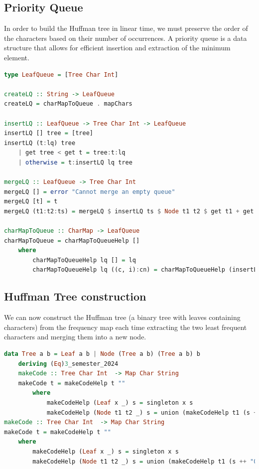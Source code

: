\documentclass{article}
\begin{document}
\subsection{Priority Queue}

In order to build the Huffman tree in linear time, we must preserve the order of
the characters based on their number of occurrences. A priority queue is a data structure that allows for efficient insertion and extraction of the minimum element.

\begin{lstlisting}[language=Haskell, caption={Priority queue implementation using a binary tree.}]
type LeafQueue = [Tree Char Int]

createLQ :: String -> LeafQueue
createLQ = charMapToQueue . mapChars

insertLQ :: LeafQueue -> Tree Char Int -> LeafQueue
insertLQ [] tree = [tree]
insertLQ (t:lq) tree
    | get tree < get t = tree:t:lq
    | otherwise = t:insertLQ lq tree

mergeLQ :: LeafQueue -> Tree Char Int
mergeLQ [] = error "Cannot merge an empty queue"
mergeLQ [t] = t
mergeLQ (t1:t2:ts) = mergeLQ $ insertLQ ts $ Node t1 t2 $ get t1 + get t2

charMapToQueue :: CharMap -> LeafQueue
charMapToQueue = charMapToQueueHelp []
    where
        charMapToQueueHelp lq [] = lq
        charMapToQueueHelp lq ((c, i):cn) = charMapToQueueHelp (insertLQ lq $ Leaf c i) cn
\end{lstlisting}

\subsection{Huffman Tree construction}

We can now construct the Huffman tree (a binary tree with leaves containing characters) from the frequency map
each time extracting the two least frequent characters and merging them into a new node.

\begin{lstlisting}[language=Haskell, caption={Huffman tree construction.}]
data Tree a b = Leaf a b | Node (Tree a b) (Tree a b) b
    deriving (Eq)3_semester_2024
    makeCode :: Tree Char Int  -> Map Char String
    makeCode t = makeCodeHelp t ""
        where
            makeCodeHelp (Leaf x _) s = singleton x s
            makeCodeHelp (Node t1 t2 _) s = union (makeCodeHelp t1 (s ++ "0")) (makeCodeHelp t2 (s ++ "1"))
makeCode :: Tree Char Int  -> Map Char String
makeCode t = makeCodeHelp t ""
    where
        makeCodeHelp (Leaf x _) s = singleton x s
        makeCodeHelp (Node t1 t2 _) s = union (makeCodeHelp t1 (s ++ "0")) (makeCodeHelp t2 (s ++ "1"))
\end{lstlisting}
\end{document}
